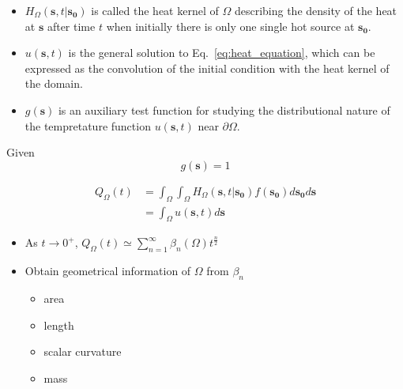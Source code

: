           \begin{itemize}
            \item $H_{\Omega}(\bm{s}, t | \bm{s_0})$ is called the heat kernel of $\Omega$ describing the density of the heat at $\bm{s}$ after time $t$ when initially there is only one single hot source at $\bm{s_0}$. 
            \item $u(\bm{s}, t)$ is the general solution to Eq.~\ref{eq:heat_equation}, which can be expressed as the convolution of the initial condition with the heat kernel of the domain.
            \item $g(\bm{s})$ is an auxiliary test function for studying the distributional nature of the tempretature function $u(\bm{s}, t)$ near $\partial \Omega$.
          \end{itemize}
          

       \par
       Given 
       \begin{equation} \label{eq:g}
         g(\bm{s}) = 1  
       \end{equation}

       \begin{align}
         Q_{\Omega}(t) &= \int_{\Omega} \int_{\Omega} H_{\Omega}(\bm{s}, t | \bm{s_0}) f(\bm{s_0})  d\bm{s_0} d\bm{s} \label{eq:heat_content_integral_full} \\
            &= \int_{\Omega} u(\bm{s}, t) d\bm{s} \label{eq:heat_content_integral_convol}
       \end{align}
       
          
        

        \begin{itemize}  
          \item As $t \rightarrow 0^{+}$, $Q_{\Omega}(t) \simeq \sum_{n=1}^{\infty} \beta_n(\Omega) t ^{\frac{n}{2}}$
          \item Obtain geometrical information of $\Omega$ from $\beta_n$
            \begin{itemize}
              \item area
              \item length
              \item scalar curvature
              \item mass
           \end{itemize}
        \end{itemize}
            
